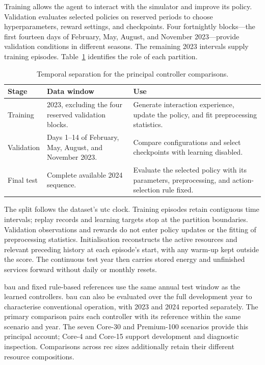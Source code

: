 Training allows the agent to interact with the simulator and improve its policy. Validation evaluates selected policies on reserved periods to choose hyperparameters, reward settings, and checkpoints. Four fortnightly blocks---the first fourteen days of February, May, August, and November 2023---provide validation conditions in different seasons. The remaining 2023 intervals supply training episodes. Table~\ref{tab:sim-temporal-split} identifies the role of each partition.

\begin{table}[htbp]
\centering\small
\caption{Temporal separation for the principal controller comparisons.}
\label{tab:sim-temporal-split}
\begin{tabularx}{\textwidth}{@{}p{}p{}X@{}}
\toprule
\textbf{Stage} & \textbf{Data window} & \textbf{Use}\\
\midrule
Training & 2023, excluding the four reserved validation blocks. & Generate interaction experience, update the policy, and fit preprocessing statistics.\\
\addlinespace
Validation & Days 1--14 of February, May, August, and November 2023. & Compare configurations and select checkpoints with learning disabled.\\
\addlinespace
Final test & Complete available 2024 sequence. & Evaluate the selected policy with its parameters, preprocessing, and action-selection rule fixed.\\
\bottomrule
\end{tabularx}
\end{table}

The split follows the dataset's \gls{utc} clock. Training episodes retain contiguous time intervals; replay records and learning targets stop at the partition boundaries. Validation observations and rewards do not enter policy updates or the fitting of preprocessing statistics. Initialisation reconstructs the active resources and relevant preceding history at each episode's start, with any warm-up kept outside the score. The continuous test year then carries stored energy and unfinished services forward without daily or monthly resets.

\gls{bau} and fixed rule-based references use the same annual test window as the learned controllers. \gls{bau} can also be evaluated over the full development year to characterise conventional operation, with 2023 and 2024 reported separately. The primary comparison pairs each controller with its reference within the same scenario and year. The seven Core-30 and Premium-100 scenarios provide this principal account; Core-4 and Core-15 support development and diagnostic inspection. Comparisons across \gls{rec} sizes additionally retain their different resource compositions.

